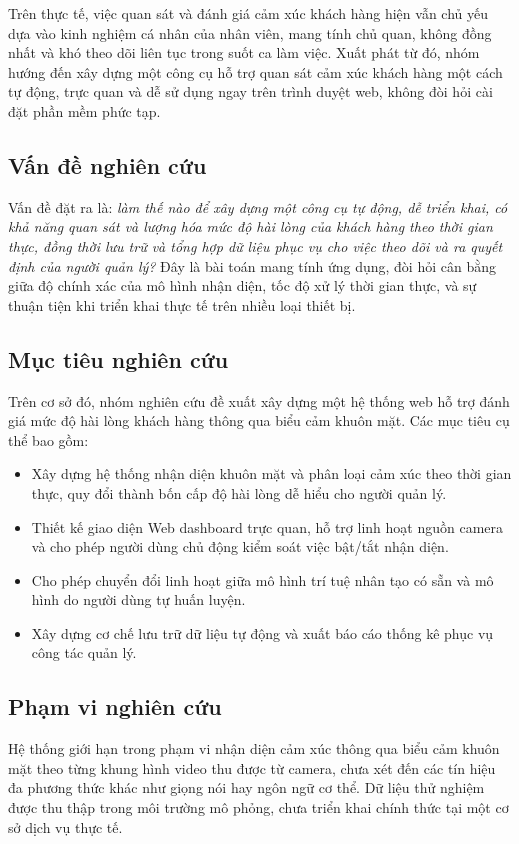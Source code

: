 \documentclass{iaesarticle}
\begin{document}
Trên thực tế, việc quan sát và đánh giá cảm xúc khách hàng hiện vẫn chủ yếu dựa vào kinh nghiệm cá nhân của nhân viên, mang tính chủ quan, không đồng nhất và khó theo dõi liên tục trong suốt ca làm việc. Xuất phát từ đó, nhóm hướng đến xây dựng một công cụ hỗ trợ quan sát cảm xúc khách hàng một cách tự động, trực quan và dễ sử dụng ngay trên trình duyệt web, không đòi hỏi cài đặt phần mềm phức tạp.

\subsection{Vấn đề nghiên cứu}
Vấn đề đặt ra là: \textit{làm thế nào để xây dựng một công cụ tự động, dễ triển khai, có khả năng quan sát và lượng hóa mức độ hài lòng của khách hàng theo thời gian thực, đồng thời lưu trữ và tổng hợp dữ liệu phục vụ cho việc theo dõi và ra quyết định của người quản lý?} Đây là bài toán mang tính ứng dụng, đòi hỏi cân bằng giữa độ chính xác của mô hình nhận diện, tốc độ xử lý thời gian thực, và sự thuận tiện khi triển khai thực tế trên nhiều loại thiết bị.

\subsection{Mục tiêu nghiên cứu}
Trên cơ sở đó, nhóm nghiên cứu đề xuất xây dựng một hệ thống web hỗ trợ đánh giá mức độ hài lòng khách hàng thông qua biểu cảm khuôn mặt. Các mục tiêu cụ thể bao gồm:
\begin{itemize}[topsep=0.3ex, itemsep=0.3ex, parsep=0.2ex]
	\item[-] Xây dựng hệ thống nhận diện khuôn mặt và phân loại cảm xúc theo thời gian thực, quy đổi thành bốn cấp độ hài lòng dễ hiểu cho người quản lý.
	\item[-] Thiết kế giao diện Web dashboard trực quan, hỗ trợ linh hoạt nguồn camera và cho phép người dùng chủ động kiểm soát việc bật/tắt nhận diện.
	\item[-] Cho phép chuyển đổi linh hoạt giữa mô hình trí tuệ nhân tạo có sẵn và mô hình do người dùng tự huấn luyện.
	\item[-] Xây dựng cơ chế lưu trữ dữ liệu tự động và xuất báo cáo thống kê phục vụ công tác quản lý.
\end{itemize}

\subsection{Phạm vi nghiên cứu}
Hệ thống giới hạn trong phạm vi nhận diện cảm xúc thông qua biểu cảm khuôn mặt theo từng khung hình video thu được từ camera, chưa xét đến các tín hiệu đa phương thức khác như giọng nói hay ngôn ngữ cơ thể. Dữ liệu thử nghiệm được thu thập trong môi trường mô phỏng, chưa triển khai chính thức tại một cơ sở dịch vụ thực tế.
\end{document}
